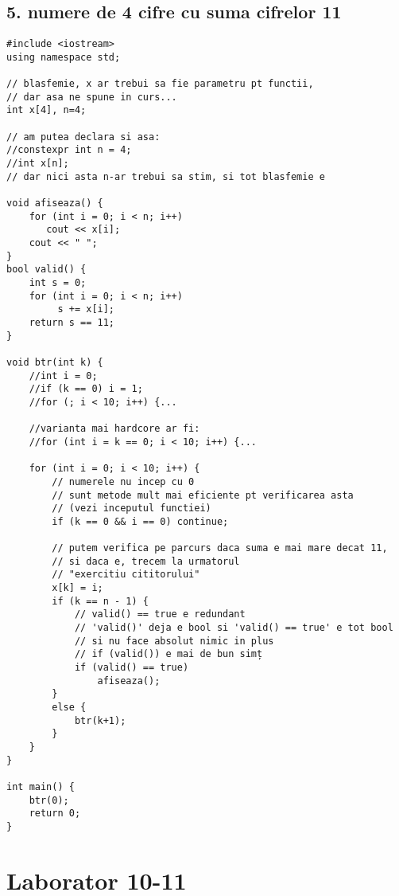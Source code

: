 \documentclass[11pt]{article}
\begin{document}
\subsection*{5. numere de 4 cifre cu suma cifrelor 11}
\label{sec:orgf8accc4}
\begin{verbatim}
#include <iostream>
using namespace std;

// blasfemie, x ar trebui sa fie parametru pt functii,
// dar asa ne spune in curs...
int x[4], n=4;

// am putea declara si asa:
//constexpr int n = 4;
//int x[n];
// dar nici asta n-ar trebui sa stim, si tot blasfemie e

void afiseaza() {
    for (int i = 0; i < n; i++)
       cout << x[i];
    cout << " ";
}
bool valid() {
    int s = 0;
    for (int i = 0; i < n; i++)
         s += x[i];
    return s == 11;
}

void btr(int k) {
    //int i = 0;
    //if (k == 0) i = 1;
    //for (; i < 10; i++) {...

    //varianta mai hardcore ar fi:
    //for (int i = k == 0; i < 10; i++) {...

    for (int i = 0; i < 10; i++) {
        // numerele nu incep cu 0
        // sunt metode mult mai eficiente pt verificarea asta
        // (vezi inceputul functiei)
        if (k == 0 && i == 0) continue;

        // putem verifica pe parcurs daca suma e mai mare decat 11,
        // si daca e, trecem la urmatorul
        // "exercitiu cititorului"
        x[k] = i;
        if (k == n - 1) {
            // valid() == true e redundant
            // 'valid()' deja e bool si 'valid() == true' e tot bool
            // si nu face absolut nimic in plus
            // if (valid()) e mai de bun simț
            if (valid() == true)
                afiseaza();
        }
        else {
            btr(k+1);
        }
    }  
}

int main() {
    btr(0);
    return 0;
}
\end{verbatim}

\pagebreak
\section*{Laborator 10-11}
\label{sec:org0eaf11e}
\end{document}

